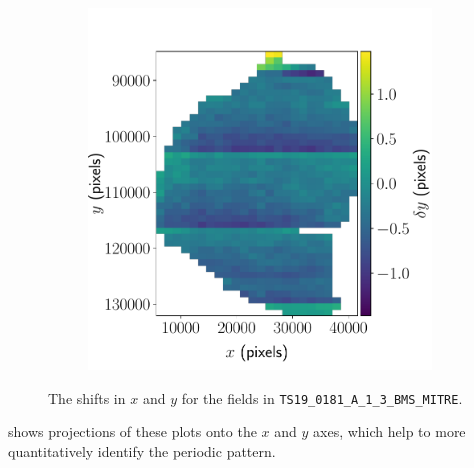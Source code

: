 \documentclass{article}
\begin{document}
\begin{figure}[ht]
\begin{subfigure}{0.49\linewidth}
		\includegraphics[width=\linewidth]{2D-shifts-AKY-y}
		\caption{}
		\label{fig:2DAKYy}
	\end{subfigure}
	\caption{The shifts in  $x$ and  $y$ for the fields in \texttt{TS19\_0181\_A\_1\_3\_BMS\_MITRE}.}
	\label{fig:2DAKY}
\end{figure}

 shows projections of these plots onto the $x$ and $y$ axes, which help to more quantitatively identify the periodic pattern.
\end{document}
